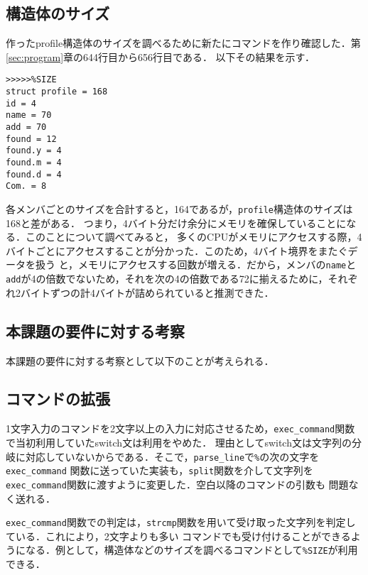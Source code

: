 \documentclass[a4j,11pt]{jarticle}
\begin{document}
\subsection{構造体のサイズ}
作ったprofile構造体のサイズを調べるために新たにコマンドを作り確認した．第\ref{sec:program}章の644行目から656行目である．
以下その結果を示す．
\begin{verbatim}
>>>>>%SIZE
struct profile = 168
id = 4
name = 70
add = 70
found = 12
found.y = 4
found.m = 4
found.d = 4
Com. = 8
\end{verbatim}
各メンバごとのサイズを合計すると，164であるが，\verb|profile|構造体のサイズは168と差がある．
つまり，4バイト分だけ余分にメモリを確保していることになる．このことについて調べてみると，
多くのCPUがメモリにアクセスする際，4バイトごとにアクセスすることが分かった．このため，4バイト境界をまたぐデータを扱う
と，メモリにアクセスする回数が増える．だから，メンバの\verb|name|と\verb|add|が4の倍数でないため，それを次の4の倍数である72に揃えるために，それぞれ2バイトずつの計4バイトが詰められていると推測できた．
\subsection{本課題の要件に対する考察}
本課題の要件に対する考察として以下のことが考えられる．
\subsection{コマンドの拡張}
1文字入力のコマンドを2文字以上の入力に対応させるため，\verb|exec_command|関数で当初利用していたswitch文は利用をやめた．
理由としてswitch文は文字列の分岐に対応していないからである．そこで，\verb|parse_line|で\verb|%|の次の文字を\verb|exec_command|
関数に送っていた実装も，\verb|split|関数を介して文字列を\verb|exec_command|関数に渡すように変更した．空白以降のコマンドの引数も
問題なく送れる．

\verb|exec_command|関数での判定は，\verb|strcmp|関数を用いて受け取った文字列を判定している．これにより，2文字よりも多い
コマンドでも受け付けることができるようになる．例として，構造体などのサイズを調べるコマンドとして\verb|%SIZE|が利用できる．
\end{document}
